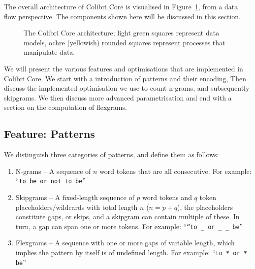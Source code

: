 The overall architecture of Colibri Core is visualised in
Figure~\ref{fig:architecture}, from a data flow perspective.  The components
shown here will be discussed in this section.

\begin{figure}[h]
\noindent{}
\caption{The Colibri Core architecture; light green squares represent data models, ochre (yellowish) rounded squares represent processes that manipulate data.}
\label{fig:architecture}
\end{figure}

We will present the various features and optimisations that are implemented in
Colibri Core. We start with a introduction of patterns and their encoding, Then
discuss the implemented optimisation we use to count n-grams, and subsequently
skipgrams. We then discuss more advanced parametrisation and end with a section
on the computation of flexgrams.

\subsection*{Feature: Patterns}
\label{sec:patterns}

We distinguish three categories of patterns, and define them as follows:

\begin{enumerate}
    \item N-grams -- A sequence of $n$ word tokens that are all consecutive.
        For example: ``\texttt{to be or not to be}''
    \item Skipgrams -- A fixed-length sequence of $p$ word tokens and $q$ token
        placeholders/wildcards with total length $n$ ($n=p+q$), the
        placeholders constitute gaps, or skips, and a skipgram can contain
        multiple of these. In turn, a gap can span one or more tokens. For
    example: ``\texttt{``to \_ or \_ \_ be}''
    \item Flexgrams -- A sequence with one or more gaps of variable length,
        which implies the pattern by itself is of undefined length. For example:
        ``\texttt{to * or * be}''
\end{enumerate}

